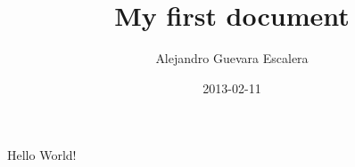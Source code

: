 \documentclass{article}
\title{My first document}
\date{2013-02-11}
\author{Alejandro Guevara Escalera}
\begin{document}
  \maketitle
  \newpage

  Hello World!
\end{document}
